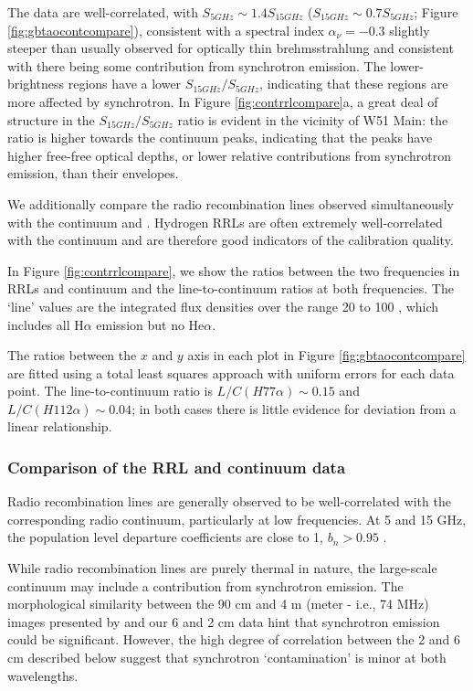 The data are well-correlated, with $S_{5 GHz} \sim 1.4 S_{15 GHz}$ ($S_{15 GHz}
\sim 0.7 S_{5 GHz}$; Figure \ref{fig:gbtaocontcompare}), consistent with a
spectral index $\alpha_\nu=-0.3$
slightly steeper than usually observed for optically thin brehmsstrahlung and
consistent with there being some contribution from synchrotron emission.  The
lower-brightness regions have a lower $S_{15 GHz}/S_{5 GHz}$, indicating that
these regions are more affected by synchrotron.  In Figure
\ref{fig:contrrlcompare}a, a great deal of structure in the $S_{15 GHz}/S_{5
GHz}$ ratio is evident in the vicinity of W51 Main: the ratio is higher towards
the continuum peaks, indicating that the peaks have higher free-free optical
depths, or lower relative contributions from synchrotron emission, than their
envelopes.

We additionally compare the radio recombination lines observed simultaneously
with the continuum and \formaldehyde.  Hydrogen RRLs are often extremely
well-correlated with the continuum and are therefore good indicators of the
calibration quality.

In Figure \ref{fig:contrrlcompare}, we show the ratios between the two
frequencies in RRLs and continuum and the line-to-continuum ratios at both
frequencies.  The `line' values are the integrated flux densities over the
range 20 to 100 \kms, which includes all H$\alpha$ emission but no He$\alpha$.

The ratios between the $x$ and $y$ axis in each plot in Figure
\ref{fig:gbtaocontcompare} are fitted using a total least squares approach with
uniform errors for each data point.   The line-to-continuum ratio is
$L/C(H77\alpha)\sim0.15$ and $L/C(H112\alpha)\sim0.04$; in both cases there is
little evidence for deviation from a linear relationship.

\subsubsection{Comparison of the RRL and continuum data}
\label{sec:rrlvscont}
Radio recombination lines are generally observed to be well-correlated with the
corresponding radio continuum, particularly at low frequencies.  At 5 and 15
GHz, the population level departure coefficients are close to 1, $b_n > 0.95$
\citep{Wilson2009a,Walmsley1990a}.

While radio recombination lines are purely thermal in nature, the large-scale
continuum may include a contribution from synchrotron emission.  The
morphological similarity between the 90 cm and 4 m (meter - i.e., 74 MHz)
images presented by \citet{Brogan2013a} and our 6 and 2 cm data hint that
synchrotron emission could be significant.  However, the high degree of
correlation between the 2 and 6 cm described below suggest that synchrotron
`contamination' is minor at both wavelengths.

